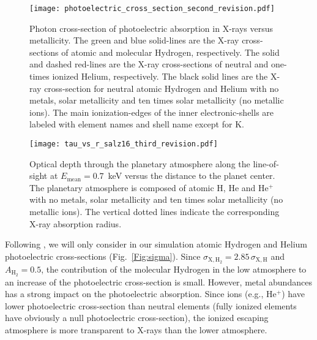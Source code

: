\documentclass[iop]{emulateapj}
\begin{document}
\begin{figure}[!t]
  \texttt{[image: photoelectric\_cross\_section\_second\_revision.pdf]}
  \caption{Photon cross-section of photoelectric absorption in X-rays 
	  versus metallicity. The green and blue solid-lines
	  are the X-ray cross-sections of atomic and molecular 
	  Hydrogen, respectively. The solid and dashed red-lines
	  are the X-ray cross-sections of neutral and one-times ionized 
	  Helium, respectively. The black solid lines are 
	  the X-ray cross-section for neutral atomic Hydrogen 
	  and Helium with no metals, solar metallicity and ten times 
	  solar metallicity (no metallic ions). The main 
	  ionization-edges of the inner electronic-shells are 
	  labeled with element names and shell name except for K.}
  \label{Fig:sigma}
\medskip
  \centering
  \texttt{[image: tau\_vs\_r\_salz16\_third\_revision.pdf]}
  \caption{Optical depth through the planetary atmosphere along the line-of-sight
	  at $E_\mathrm{mean}=0.7$~keV versus the distance to the planet 
	  center. The planetary atmosphere is composed of
	  atomic H, He and He$^+$ with no metals, solar 
	  metallicity and ten times solar metallicity (no 
	  metallic ions). The vertical dotted lines indicate the 
	  corresponding X-ray absorption radius.}
  \label{Fig:tau}
\end{figure}  


Following \citet{Salz2016}, we will only consider in our simulation atomic Hydrogen and Helium photoelectric 
cross-sections (Fig.~\ref{Fig:sigma}). Since $\sigma_{\mathrm{X,H_2}} = 2.85\,\sigma_\mathrm{X,H}$ \citep{Wilms2000} 
and $A_\mathrm{H_2}=0.5$, the contribution of the molecular Hydrogen in the low atmosphere to an increase of the 
photoelectric cross-section is small. However, metal abundances has a strong impact on the photoelectric absorption.
Since ions (e.g., He$^+$) have lower photoelectric cross-section than neutral elements (fully ionized elements 
have obviously a null photoelectric cross-section), the ionized escaping atmosphere is more transparent to X-rays 
than the lower atmosphere.
\end{document}
